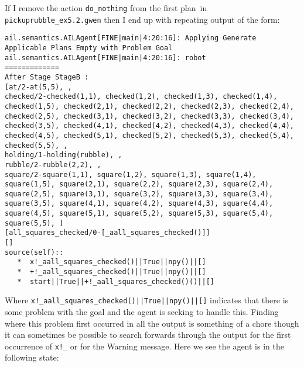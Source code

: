 If I remove the action \texttt{do\_nothing} from the first plan\ in \texttt{pickuprubble\_ex5.2.gwen} then I end up with repeating output of the form:

\begin{verbatim}
ail.semantics.AILAgent[FINE|main|4:20:16]: Applying Generate Applicable Plans Empty with Problem Goal 
ail.semantics.AILAgent[FINE|main|4:20:16]: robot
=============
After Stage StageB :
[at/2-at(5,5), , 
checked/2-checked(1,1), checked(1,2), checked(1,3), checked(1,4), checked(1,5), checked(2,1), checked(2,2), checked(2,3), checked(2,4), checked(2,5), checked(3,1), checked(3,2), checked(3,3), checked(3,4), checked(3,5), checked(4,1), checked(4,2), checked(4,3), checked(4,4), checked(4,5), checked(5,1), checked(5,2), checked(5,3), checked(5,4), checked(5,5), , 
holding/1-holding(rubble), , 
rubble/2-rubble(2,2), , 
square/2-square(1,1), square(1,2), square(1,3), square(1,4), square(1,5), square(2,1), square(2,2), square(2,3), square(2,4), square(2,5), square(3,1), square(3,2), square(3,3), square(3,4), square(3,5), square(4,1), square(4,2), square(4,3), square(4,4), square(4,5), square(5,1), square(5,2), square(5,3), square(5,4), square(5,5), ]
[all_squares_checked/0-[_aall_squares_checked()]]
[]
source(self):: 
   *  x!_aall_squares_checked()||True||npy()||[]
   *  +!_aall_squares_checked()||True||npy()||[]
   *  start||True||+!_aall_squares_checked()()||[]
\end{verbatim}

Where \texttt{x!\_aall\_squares\_checked()||True||npy()||[]} indicates that there is some problem with the goal and the agent is seeking to handle this.  Finding where this problem first occurred in all the output is something of a chore though it can sometimes be possible to search forwards through the output for the first occurrence of \texttt{x!\_}  or for the Warning message.  Here we see the agent is in the following state:

